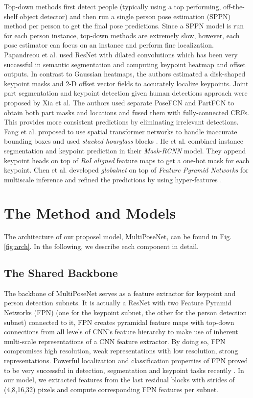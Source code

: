 \documentclass[runningheads]{llncs}
\begin{document}
Top-down methods first detect people (typically using a top performing, off-the-shelf object detector) and then run a single person pose estimation (SPPN) method per person to get the final pose predictions. Since a SPPN model is run for each person instance, top-down methods are extremely slow, however, each pose estimator can focus on an instance and perform fine localization. Papandreou et al.\cite{Papandreou2017} used ResNet with dilated convolutions \cite{He2016} which has been very successful in semantic segmentation \cite{Chen2016} and computing keypoint heatmap and offset outputs. In contrast to Gaussian heatmaps, the authors estimated a disk-shaped keypoint masks and 2-D offset vector fields to accurately localize keypoints. Joint part segmentation and keypoint detection given human detections approach were proposed by Xia et al.\cite{Xia} The authors used separate PoseFCN and PartFCN to obtain both part masks and locations and fused them with fully-connected CRFs. This provides more consistent predictions by eliminating irrelevant detections. Fang et al.\cite{Fang2017} proposed to use spatial transformer networks to handle inaccurate bounding boxes and used \textit{stacked hourglass} blocks \cite{Newella}. He et al.\cite{He2017a} combined instance segmentation and keypoint prediction in their \textit{Mask-RCNN} model. They append keypoint heads on top of \textit{RoI aligned} feature maps to get  a one-hot mask for each keypoint. Chen et al.\cite{Chen2017a} developed \textit{globalnet} on top of \textit{Feature Pyramid Networks} \cite{Lina} for multiscale inference and refined the predictions by using hyper-features \cite{Kong}.
\section{The Method and Models} 
The architecture of our proposel model, MultiPoseNet, can be found in Fig. \ref{fig:arch}. In the following, we describe each component in detail. 






\subsection{The Shared Backbone}
\label{sec:method-backbone}
The backbone of MultiPoseNet serves as  a feature extractor for keypoint and person detection subnets. It is actually a ResNet \cite{He2016} with two Feature Pyramid Networks (FPN)\cite{Lina} (one for the keypoint subnet, the other for the person detection subnet) connected to it, FPN creates pyramidal feature maps with top-down connections from all levels of CNN’s feature hierarchy to make use of inherent multi-scale representations of a CNN feature extractor. By doing so, FPN compromises high resolution, weak representations with low resolution, strong representations. Powerful localization and classification properties of FPN proved to be very successful in detection, segmentation and keypoint tasks recently \cite{Chen2017a, He2017a, Lin2017, Lina}. In our model, we extracted features from the last residual blocks  with strides of (4,8,16,32) pixels and compute corresponding FPN features per subnet.
\end{document}
